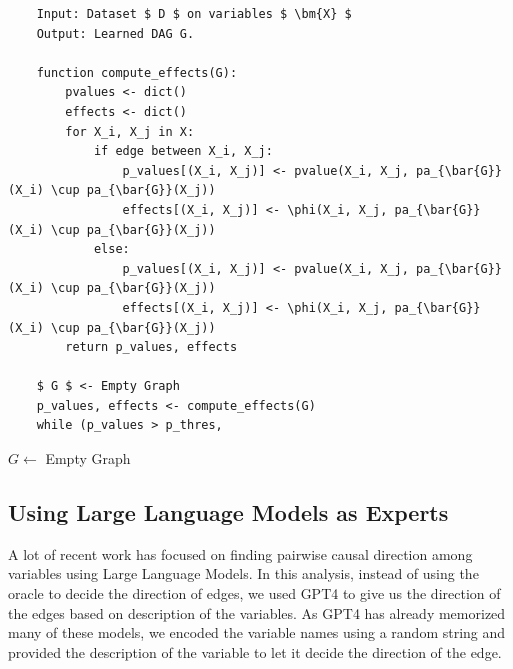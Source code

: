 \documentclass{uai2025} %
\begin{document}
\begin{verbatim}
	Input: Dataset $ D $ on variables $ \bm{X} $
	Output: Learned DAG G.
	
	function compute_effects(G):
		pvalues <- dict()
		effects <- dict()
		for X_i, X_j in X:
			if edge between X_i, X_j:
				p_values[(X_i, X_j)] <- pvalue(X_i, X_j, pa_{\bar{G}}(X_i) \cup pa_{\bar{G}}(X_j))
				effects[(X_i, X_j)] <- \phi(X_i, X_j, pa_{\bar{G}}(X_i) \cup pa_{\bar{G}}(X_j))
			else:
				p_values[(X_i, X_j)] <- pvalue(X_i, X_j, pa_{\bar{G}}(X_i) \cup pa_{\bar{G}}(X_j))
				effects[(X_i, X_j)] <- \phi(X_i, X_j, pa_{\bar{G}}(X_i) \cup pa_{\bar{G}}(X_j))
		return p_values, effects
	
	$ G $ <- Empty Graph
	p_values, effects <- compute_effects(G)
	while (p_values > p_thres, 
\end{verbatim}

\begin{algorithm}
	\BlankLine
	$ G \leftarrow $ Empty Graph
\end{algorithm}


\subsection{Using Large Language Models as Experts}
A lot of recent work has focused on finding pairwise causal direction among
variables using Large Language Models. In this analysis, instead of using the
oracle to decide the direction of edges, we used GPT4 to give us the direction
of the edges based on description of the variables. As GPT4 has already
memorized many of these models, we encoded the variable names using a random
string and provided the description of the variable to let it decide the
direction of the edge.
\end{document}
